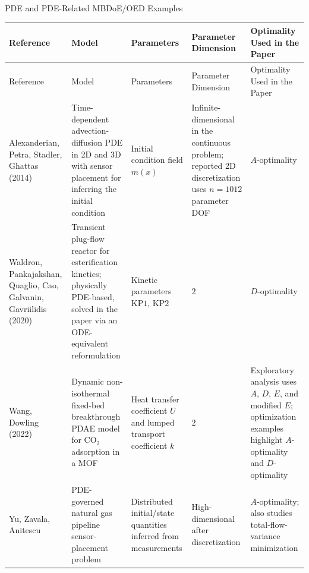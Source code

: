 \documentclass[11pt]{article}
\begin{document}
\begin{center}
\Large PDE and PDE-Related MBDoE/OED Examples
\end{center}

\begin{longtable}{p{3.2cm} p{3.6cm} p{3.2cm} p{2.0cm} p{3.4cm}}
\toprule
Reference & Model & Parameters & Parameter Dimension & Optimality Used in the Paper \\
\midrule
\endfirsthead

\toprule
Reference & Model & Parameters & Parameter Dimension & Optimality Used in the Paper \\
\midrule
\endhead

\bottomrule
\endfoot

Alexanderian, Petra, Stadler, Ghattas (2014) &
Time-dependent advection-diffusion PDE in 2D and 3D with sensor placement for inferring the initial condition &
Initial condition field $m(x)$ &
Infinite-dimensional in the continuous problem; reported 2D discretization uses $n = 1012$ parameter DOF &
$A$-optimality \\

Waldron, Pankajakshan, Quaglio, Cao, Galvanin, Gavriilidis (2020) &
Transient plug-flow reactor for esterification kinetics; physically PDE-based, solved in the paper via an ODE-equivalent reformulation &
Kinetic parameters $\mathrm{KP1}$, $\mathrm{KP2}$ &
$2$ &
$D$-optimality \\

Wang, Dowling (2022) &
Dynamic non-isothermal fixed-bed breakthrough PDAE model for $\mathrm{CO_2}$ adsorption in a MOF &
Heat transfer coefficient $U$ and lumped transport coefficient $k$ &
$2$ &
Exploratory analysis uses $A$, $D$, $E$, and modified $E$; optimization examples highlight $A$-optimality and $D$-optimality \\

Yu, Zavala, Anitescu &
PDE-governed natural gas pipeline sensor-placement problem &
Distributed initial/state quantities inferred from measurements &
High-dimensional after discretization &
$A$-optimality; also studies total-flow-variance minimization \\

\end{longtable}
\end{document}
